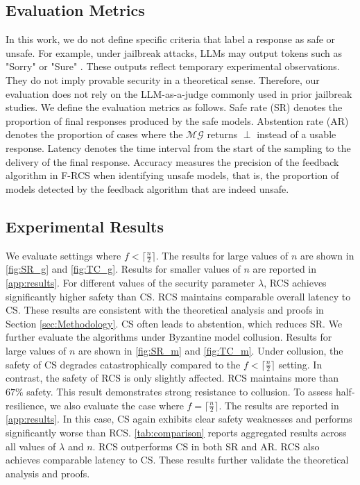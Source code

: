\documentclass[11pt]{article}
\begin{document}
\subsection{Evaluation Metrics}
In this work, we do not define specific criteria that label a response as safe or unsafe. For example, under jailbreak attacks, LLMs may output tokens such as "Sorry" or "Sure" \citep{wang-etal-2025-vulnerability}. These outputs reflect temporary experimental observations. They do not imply provable security in a theoretical sense. Therefore, our evaluation does not rely on the LLM-as-a-judge \citep{wei2025emoji} commonly used in prior jailbreak studies. We define the evaluation metrics as follows. Safe rate (SR) denotes the proportion of final responses produced by the safe models. Abstention rate (AR) denotes the proportion of cases where the $\mathcal{MG}$ returns $\perp$ instead of a usable response. Latency denotes the time interval from the start of the sampling to the delivery of the final response. Accuracy measures the precision of the feedback algorithm in F-RCS when identifying unsafe models, that is, the proportion of models detected by the feedback algorithm that are indeed unsafe.

\subsection{Experimental Results}
We evaluate settings where $f < \lceil \frac{n}{2} \rceil$. The results for large values of $n$ are shown in \autoref{fig:SR_g} and \autoref{fig:TC_g}. Results for smaller values of $n$ are reported in \autoref{app:results}. For different values of the security parameter $\lambda$, RCS achieves significantly higher safety than CS. RCS maintains comparable overall latency to CS. These results are consistent with the theoretical analysis and proofs in Section \ref{sec:Methodology}. CS often leads to abstention, which reduces SR. We further evaluate the algorithms under Byzantine model collusion. Results for large values of $n$ are shown in \autoref{fig:SR_m} and \autoref{fig:TC_m}. Under collusion, the safety of CS degrades catastrophically compared to the $f < \lceil \frac{n}{2} \rceil$ setting. In contrast, the safety of RCS is only slightly affected. RCS maintains more than $67\%$ safety. This result demonstrates strong resistance to collusion. To assess half-resilience, we also evaluate the case where $f = \lceil \frac{n}{2} \rceil$. The results are reported in \autoref{app:results}. In this case, CS again exhibits clear safety weaknesses and performs significantly worse than RCS. \autoref{tab:comparison} reports aggregated results across all values of $\lambda$ and $n$. RCS outperforms CS in both SR and AR. RCS also achieves comparable latency to CS. These results further validate the theoretical analysis and proofs.
\end{document}
